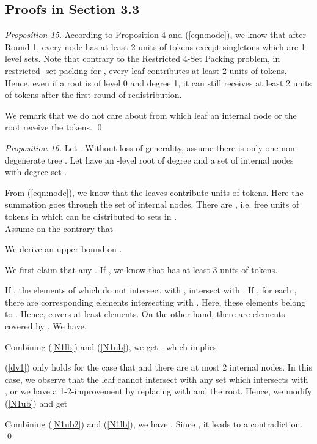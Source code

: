 \documentclass[runningheads,a4paper]{llncs}
\numberwithin{equation}{section}
\begin{document}
\subsection{Proofs in Section 3.3}

\begin{proof}[Proposition 15]
According to Proposition 4 and (\ref{eqn:node}), we know that after Round 1, every node has at least 2 units of tokens except singletons which are 1-level sets. Note that contrary to the Restricted 4-Set Packing problem, in restricted -set packing for , every leaf contributes at least 2 units of tokens. Hence, even if a root is of level 0 and degree 1, it can still receives at least 2 units of tokens after the first round of redistribution.

We remark that we do not care about from which leaf an internal node or the root receive the tokens. \qed
\end{proof}

\begin{proof}[Proposition 16]
Let . Without loss of generality, assume there is only one non-degenerate tree . Let  have an -level root of degree  and a set of internal nodes with degree set .

From (\ref{eqn:node}), we know that the leaves contribute  units of tokens. Here the summation goes through the set of internal nodes. There are , i.e.  free units of tokens in  which can be distributed to sets in . \\
Assume on the contrary that
        

        We derive an upper bound on .

        We first claim that any . If , we know that  has at least 3 units of tokens.

        If , the  elements of  which do not intersect with , intersect with . If , for each , there are  corresponding elements intersecting with . Here, these  elements belong to . Hence,  covers at least  elements. On the other hand, there are  elements covered by . We have,
        
        Combining (\ref{N1lb}) and (\ref{N1ub}), we get , which implies
        
        (\ref{dv1}) only holds for the case that  and there are at most 2 internal nodes. In this case, we observe that the leaf cannot intersect with any set  which intersects with , or we have a 1-2-improvement by replacing  with  and the root. Hence, we modify (\ref{N1ub}) and get
        
        Combining (\ref{N1ub2}) and (\ref{N1lb}), we have . Since , it leads to a contradiction. \qed
\end{proof}
\end{document}
